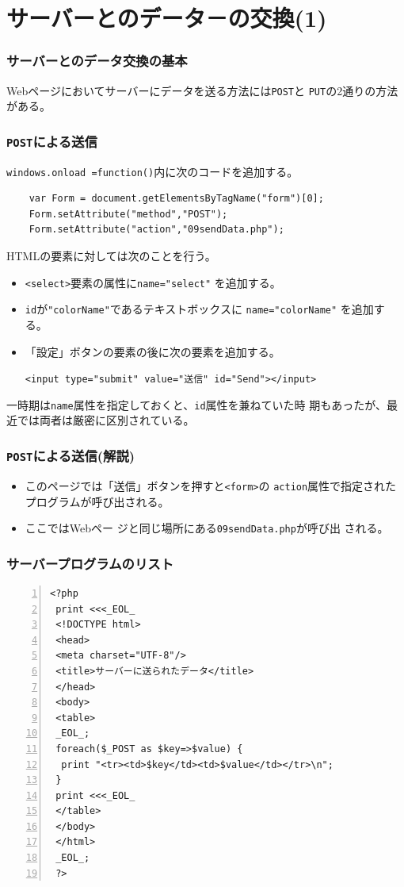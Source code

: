 \section{サーバーとのデータ－の交換(1)}
 \begin{frame}[containsverbatim]
 \frametitle{サーバーとのデータ交換の基本}
 Webページにおいてサーバーにデータを送る方法には\texttt{POST}と
 \texttt{PUT}の2通りの方法がある。
 \end{frame}
 \begin{frame}[containsverbatim]
 \frametitle{\texttt{POST}による送信}
 \texttt{windows.onload =function()}内に次のコードを追加する。
 \begin{Verbatim}
    var Form = document.getElementsByTagName("form")[0];
    Form.setAttribute("method","POST");
    Form.setAttribute("action","09sendData.php");
 \end{Verbatim}
 HTMLの要素に対しては次のことを行う。
 \begin{itemize}
 \item \texttt{<select>}要素の属性に\verb+name="select"+ を追加する。
 \item \texttt{id}が\verb+"colorName"+であるテキストボックスに
       \verb+name="colorName"+ を追加する。
 \item 「設定」ボタンの要素の後に次の要素を追加する。
 \begin{center}
 \verb+<input type="submit" value="送信" id="Send"></input>+ 
 \end{center}
 \end{itemize}
 一時期は\texttt{name}属性を指定しておくと、\texttt{id}属性を兼ねていた時
 期もあったが、最近では両者は厳密に区別されている。
\end{frame}
 \begin{frame}[containsverbatim]
 \frametitle{\texttt{POST}による送信(解説)}
 \begin{itemize}
 \item このページでは「送信」ボタンを押すと\texttt{<form>}の
 \texttt{action}属性で指定されたプログラムが呼び出される。
 \item ここではWebペー ジと同じ場所にある\texttt{09sendData.php}が呼び出
      される。
 \end{itemize}
 \end{frame}
 \begin{frame}[containsverbatim]
 \frametitle{サーバープログラムのリスト}
 \begin{Verbatim}[numbers=left, fontsize=\scriptsize]
 <?php
 print <<<_EOL_
 <!DOCTYPE html>
 <head>
 <meta charset="UTF-8"/>
 <title>サーバーに送られたデータ</title>
 </head>
 <body>
 <table>
 _EOL_;
 foreach($_POST as $key=>$value) {
  print "<tr><td>$key</td><td>$value</td></tr>\n";
 }
 print <<<_EOL_
 </table>
 </body>
 </html>
 _EOL_;
 ?>
 \end{Verbatim}
 \end{frame}

